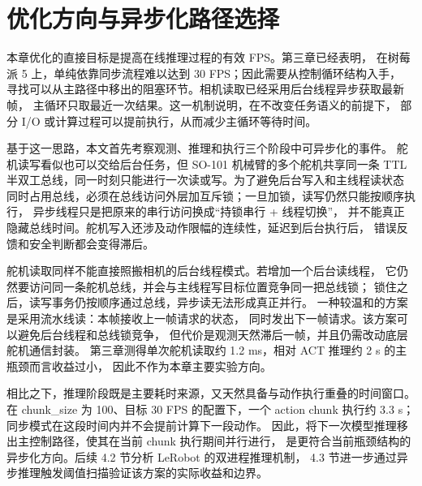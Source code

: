 \section{优化方向与异步化路径选择}\label{sec:opt-motivation}\label{sec:async-feasibility}

本章优化的直接目标是提高在线推理过程的有效 FPS。第三章已经表明，
在树莓派 5 上，单纯依靠同步流程难以达到 30 FPS；因此需要从控制循环结构入手，
寻找可以从主路径中移出的阻塞环节。相机读取已经采用后台线程异步获取最新帧，
主循环只取最近一次结果。这一机制说明，在不改变任务语义的前提下，
部分 I/O 或计算过程可以提前执行，从而减少主循环等待时间。

基于这一思路，本文首先考察观测、推理和执行三个阶段中可异步化的事件。
舵机读写看似也可以交给后台任务，但 SO-101 机械臂的多个舵机共享同一条
TTL 半双工总线，同一时刻只能进行一次读或写。为了避免后台写入和主线程读状态
同时占用总线，必须在总线访问外层加互斥锁；一旦加锁，读写仍然只能按顺序执行，
异步线程只是把原来的串行访问换成“持锁串行 + 线程切换”，
并不能真正隐藏总线时间。舵机写入还涉及动作限幅的连续性，延迟到后台执行后，
错误反馈和安全判断都会变得滞后。

舵机读取同样不能直接照搬相机的后台线程模式。若增加一个后台读线程，
它仍然要访问同一条舵机总线，并会与主线程写目标位置竞争同一把总线锁；
锁住之后，读写事务仍按顺序通过总线，异步读无法形成真正并行。
一种较温和的方案是采用流水线读：本帧接收上一帧请求的状态，
同时发出下一帧请求。该方案可以避免后台线程和总线锁竞争，
但代价是观测天然滞后一帧，并且仍需改动底层舵机通信封装。
第三章测得单次舵机读取约 1.2 ms，相对 ACT 推理约 2 s 的主瓶颈而言收益过小，
因此不作为本章主要实验方向。

相比之下，推理阶段既是主要耗时来源，又天然具备与动作执行重叠的时间窗口。
在 chunk\_size 为 100、目标 30 FPS 的配置下，一个 action chunk
执行约 3.3 s；同步模式在这段时间内并不会提前计算下一段动作。
因此，将下一次模型推理移出主控制路径，使其在当前 chunk 执行期间并行进行，
是更符合当前瓶颈结构的异步化方向。后续 4.2 节分析 LeRobot 的双进程推理机制，
4.3 节进一步通过异步推理触发阈值扫描验证该方案的实际收益和边界。
